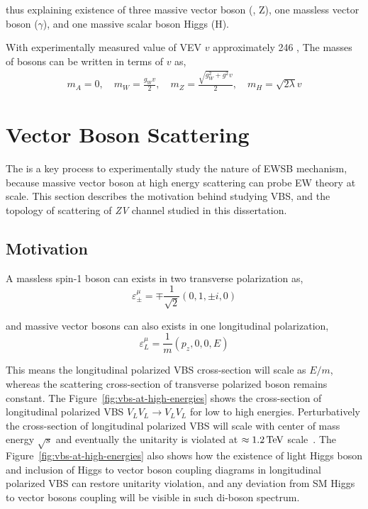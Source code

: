 thus explaining existence of three massive vector boson (\Wplusminus{}, Z), one massless
vector boson (\( \gamma \)), and one massive scalar boson Higgs (H).

With experimentally measured value of \gls{VEV} \( v \) approximately 246 \GeV{},
The masses of bosons can be written in terms of \( v \) as,
%
\begin{align}
  m_A = 0, \quad
  m_W = \frac{g_{W} v}{2}, \quad
  m_Z = \frac{\sqrt{g^{2}_{W} + g^{2}} v }{2}, \quad
  m_H = \sqrt{2\lambda} v
\end{align}

\section{
  Vector Boson Scattering
 }\label{ch_intro:vbs}

The  is a key process to experimentally study the nature of
\gls{EWSB} mechanism, because massive vector boson at high energy
scattering can probe \gls{EW} theory at \TeV{} scale.
This section describes the motivation behind studying \gls{VBS}, and
the topology of scattering of \textit{ZV} channel studied in this dissertation.

\subsection{Motivation}

A massless spin-1 boson can exists in two transverse polarization as,
%
\begin{equation}
  \varepsilon^{\mu}_{\pm} = \mp \frac{1}{\sqrt{2}} (0, 1, \pm i, 0)
\end{equation}

and massive vector bosons can also exists in one longitudinal polarization,
%
\begin{equation}
  \varepsilon^{\mu}_{L} = \frac{1}{m} (p_z, 0, 0 , E)
\end{equation}

This means the longitudinal polarized \gls{VBS} cross-section will scale as \( E/m \),
whereas the scattering cross-section of transverse polarized boson remains constant.
The Figure~\ref{fig:vbs-at-high-energies} shows the cross-section
of longitudinal polarized \gls{VBS} \( V_L V_L \to V_L V_L\)
for low to high energies. Perturbatively the cross-section of
longitudinal polarized \gls{VBS} will scale with center of mass energy
\( \sqrt{s} \) and eventually the unitarity is violated at
\( \approx 1.2 \,\text{Te\hspace{-.08em}V}{} \) scale~\cite{Lee1977,Lee1977a}.
The Figure~\ref{fig:vbs-at-high-energies} also shows
how the existence of light Higgs boson and
inclusion of Higgs to vector boson coupling diagrams in longitudinal
polarized \gls{VBS} can restore unitarity violation,
and any deviation from \gls{SM} Higgs to vector
bosons coupling will be visible in such di-boson spectrum.

